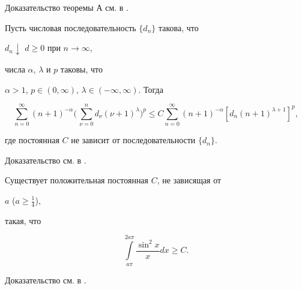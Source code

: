 \medskip 


 


Доказательство теоремы А см. в \cite{Har}. 


 




\begin{lem} Пусть числовая последовательность $\{d_n\}$ такова, что 


$d_n\downarrow$ $d\ge 0$ при $n\to\infty$, 


числа $\alpha$, $\lambda$ и $p$ таковы, что 


$\alpha>1$, $p\in(0,\infty)$, $\lambda\in(-\infty,\infty)$. Тогда 


$$ 


\sum^\infty_{n=0}(n+1)^{-\alpha}\biggl(\, 


\sum^n_{\nu=0}d_\nu(\nu+1)^\lambda\biggr)^p \le 


C\sum^\infty_{n=0}(n+1)^{-\alpha}[d_n(n+1)^{\lambda+1}]^p, 


$$ 


где постоянная $C$ не зависит от последовательности $\{d_n\}$. 


\end{lem} 


 


Доказательство см. в \cite{Vu1}. 


 




\begin{lem} Существует положительная постоянная $C$, не зависящая от 


$a$ ($a\ge\frac{1}{4}$), 


такая, что 


$$ 


\int\limits^{2a\pi}_{a\pi}\frac{\sin^2x}{x}dx\ge C. 


$$ 


\end{lem} 


 


Доказательство см. в \cite{Vu2}. 


 




